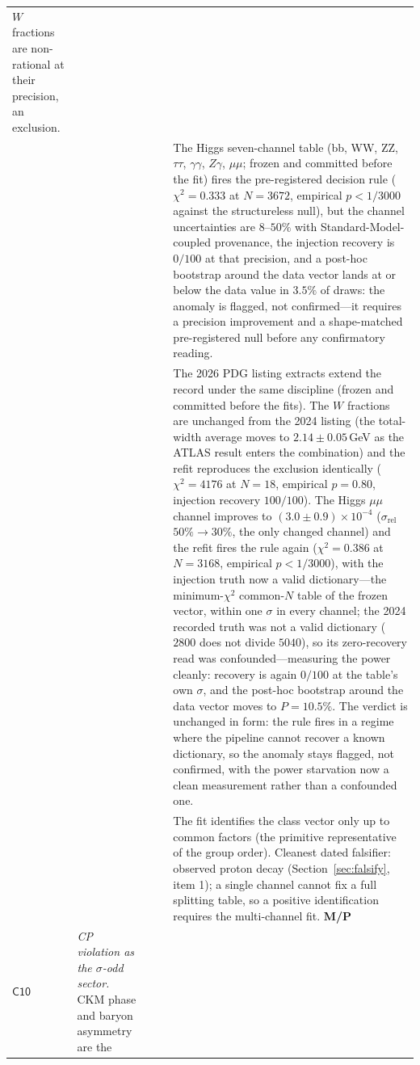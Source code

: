 \documentclass[11pt,a4paper]{article}
\theoremstyle{plain}
\theoremstyle{definition}
\theoremstyle{remark}
\begin{document}
\begin{longtable}{@{}p{}p{}p{}p{}p{}@{}}
$W$ fractions are non-rational at their precision, an exclusion.\\
 & & & & The Higgs seven-channel
table (bb, WW, ZZ, $\tau\tau$, $\gamma\gamma$, $Z\gamma$, $\mu\mu$; frozen and committed
before the fit) fires the pre-registered decision rule ($\chi^{2}=0.333$ at $N=3672$,
empirical $p<1/3000$ against the structureless null), but the channel uncertainties are
$8$--$50\%$ with Standard-Model-coupled provenance, the injection recovery is $0/100$ at
that precision, and a post-hoc bootstrap around the data vector lands at or below the
data value in $3.5\%$ of draws: the anomaly is flagged, not confirmed---it requires a
precision improvement and a shape-matched pre-registered null before any confirmatory
reading.\\
 & & & & The 2026 PDG listing extracts extend the record under the
same discipline (frozen and committed before the fits). The $W$ fractions
are unchanged from the 2024 listing (the total-width average moves to
$2.14\pm0.05$\,GeV as the ATLAS result enters the combination) and the
refit reproduces the exclusion identically ($\chi^{2}=4176$ at $N=18$,
empirical $p=0.80$, injection recovery $100/100$). The Higgs $\mu\mu$
channel improves to $(3.0\pm0.9)\times10^{-4}$ ($\sigma_{\mathrm{rel}}$
$50\%\to30\%$, the only changed channel) and the refit fires the rule
again ($\chi^{2}=0.386$ at $N=3168$, empirical $p<1/3000$), with the
injection truth now a valid dictionary---the minimum-$\chi^{2}$
common-$N$ table of the frozen vector, within one $\sigma$ in every
channel; the 2024 recorded truth was not a valid dictionary ($2800$ does
not divide $5040$), so its zero-recovery read was confounded---measuring
the power cleanly: recovery is again $0/100$ at the table's own
$\sigma$, and the post-hoc bootstrap around the data vector moves to
$P=10.5\%$. The verdict is unchanged in form: the rule fires in a
regime where the pipeline cannot recover a known dictionary, so the
anomaly stays flagged, not confirmed, with the power starvation now a
clean measurement rather than a confounded one.\\
 & & & & The fit identifies the class vector only up to common
factors (the primitive representative of the group order). Cleanest dated falsifier:
observed proton decay
(Section~\ref{sec:falsify}, item 1); a single channel cannot fix a full splitting table, so
a positive identification requires the multi-channel fit. \textbf{M/P}\\
$\mathsf{C10}$ &
\emph{CP violation as the $\sigma$-odd sector.} CKM phase and baryon asymmetry are the

\end{longtable}
\end{document}
